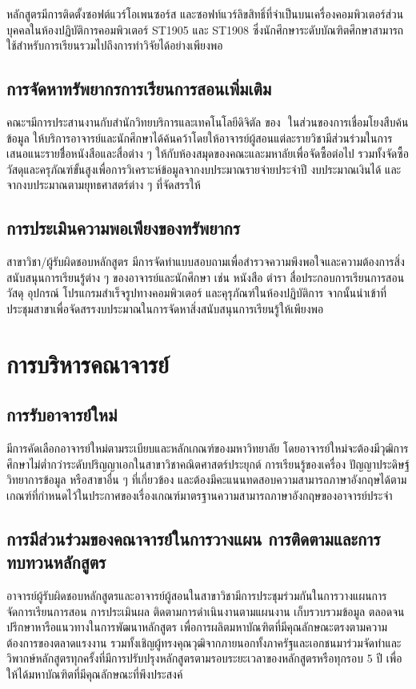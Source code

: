  \par\medskip

หลักสูตรมีการติดตั้งซอฟต์แวร์โอเพนซอร์ส และซอฟท์แวร์ลิขสิทธิ์ที่จำเป็นบนเครื่องคอมพิวเตอร์ส่วนบุคคลในห้องปฏิบัติการคอมพิวเตอร์ ST1905 และ ST1908 ซึ่งนักศึกษาระดับบัณฑิตศึกษาสามารถใช้สำหรับการเรียนรวมไปถึงการทำวิจัยได้อย่างเพียงพอ
\subsection{การจัดหาทรัพยากรการเรียนการสอนเพิ่มเติม}
คณะฯมีการประสานงานกับสำนักวิทยบริการและเทคโนโลยีดิจิตัล ของ\university \,\, ในส่วนของการเชื่อมโยงสืบค้นข้อมูล ให้บริการอาจารย์และนักศึกษาได้ค้นคว้าโดยให้อาจารย์ผู้สอนแต่ละรายวิชามีส่วนร่วมในการเสนอแนะรายชื่ิอหนังสือและสื่อต่าง ๆ ให้กับห้องสมุดของคณะและมหาลัยเพื่อจัดซื้อต่อไป รวมทั้งจัดซื้อวัสดุและครุภัณฑ์ขั้นสูงเพื่อการวิเคราะห์ข้อมูลจากงบประมาณรายจ่ายประจำปี งบประมาณเงินได้ และจากงบประมาณตามยุทธศาสตร์ต่าง ๆ ที่\university จัดสรรให้

\subsection{การประเมินความพอเพียงของทรัพยากร}
สาขาวิชา/ผู้รับผิดชอบหลักสูตร มีการจัดทำแบบสอบถามเพื่อสำรวจความพึงพอใจและความต้องการสิ่งสนับสนุนการเรียนรู้ต่าง ๆ ของอาจารย์และนักศึกษา เช่น หนังสือ ตำรา สื่อประกอบการเรียนการสอน วัสดุ อุปกรณ์ โปรแกรมสำเร็จรูปทางคอมพิวเตอร์ และคุรุภัณฑ์ในห้องปฏิบัติการ จากนั้นนำเข้าที่ประชุมสาขา\thdegreebranch เพื่อจัดสรรงบประมาณในการจัดหาสิ่งสนับสนุนการเรียนรู้ให้เพียงพอ


\section{การบริหารคณาจารย์}
\subsection{การรับอาจารย์ใหม่}
มีการคัดเลือกอาจารย์ใหม่ตามระเบียบและหลักเกณฑ์ของมหาวิทยาลัย โดยอาจารย์ใหม่จะต้องมีวุฒิการศึกษาไม่ต่ำกว่าระดับปริญญาเอกในสาขาวิชาคณิตศาสตร์ประยุกต์ การเรียนรู้ของเครื่อง ปัญญาประดิษฐ์ วิทยาการข้อมูล หรือสาขาอื่น ๆ ที่เกี่ยวข้อง และต้องมีคะแนนทดสอบความสามารถภาษาอังกฤษได้ตามเกณฑ์ที่กำหนดไว้ในประกาศของ\university เรื่องเกณฑ์มาตรฐานความสามารถภาษาอังกฤษของอาจารย์ประจำ

 \subsection{การมีส่วนร่วมของคณาจารย์ในการวางแผน การติดตามและการทบทวนหลักสูตร}
อาจารย์ผู้รับผิดชอบหลักสูตรและอาจารย์ผู้สอนในสาขาวิชามีการประชุมร่วมกันในการวางแผนการจัดการเรียนการสอน การประเมินผล ติดตามการดำเนินงานตามแผนงาน เก็บรวบรวมข้อมูล ตลอดจนปรึกษาหารือแนวทางในการพัฒนาหลักสูตร เพื่อการผลิตมหาบัณฑิตที่มีคุณลักษณะตรงตามความต้องการของตลาดแรงงาน รวมทั้งเชิญผู้ทรงคุณวุฒิจากภายนอกทั้งภาครัฐและเอกชนมาร่วมจัดทำและวิพากษ์หลักสูตรทุกครั้งที่มีการปรับปรุงหลักสูตรตามรอบระยะเวลาของหลักสูตรหรือทุกรอบ 5 ปี เพื่อให้ได้มหาบัณฑิตที่มีคุณลักษณะที่พึงประสงค์

